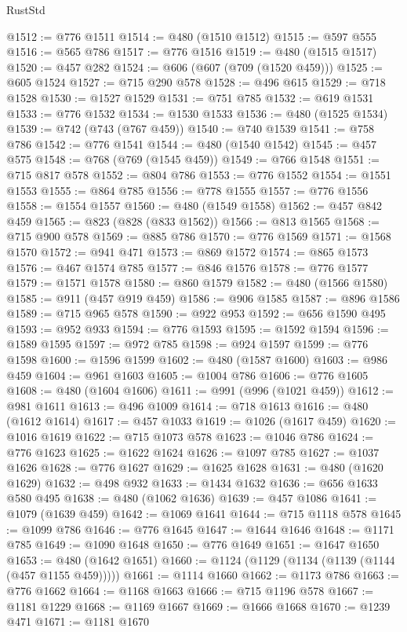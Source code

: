 \begin{lexlean}{RustStd}
\begin{coremodule}
@1512 := @776 @1511
@1514 := @480 (@1510 @1512)
@1515 := @597 @555
@1516 := @565 @786
@1517 := @776 @1516
@1519 := @480 (@1515 @1517)
@1520 := @457 @282
@1524 := @606 (@607 (@709 (@1520 @459)))
@1525 := @605 @1524
@1527 := @715 @290 @578
@1528 := @496 @615
@1529 := @718 @1528
@1530 := @1527 @1529
@1531 := @751 @785
@1532 := @619 @1531
@1533 := @776 @1532
@1534 := @1530 @1533
@1536 := @480 (@1525 @1534)
@1539 := @742 (@743 (@767 @459))
@1540 := @740 @1539
@1541 := @758 @786
@1542 := @776 @1541
@1544 := @480 (@1540 @1542)
@1545 := @457 @575
@1548 := @768 (@769 (@1545 @459))
@1549 := @766 @1548
@1551 := @715 @817 @578
@1552 := @804 @786
@1553 := @776 @1552
@1554 := @1551 @1553
@1555 := @864 @785
@1556 := @778 @1555
@1557 := @776 @1556
@1558 := @1554 @1557
@1560 := @480 (@1549 @1558)
@1562 := @457 @842 @459
@1565 := @823 (@828 (@833 @1562))
@1566 := @813 @1565
@1568 := @715 @900 @578
@1569 := @885 @786
@1570 := @776 @1569
@1571 := @1568 @1570
@1572 := @941 @471
@1573 := @869 @1572
@1574 := @865 @1573
@1576 := @467 @1574 @785
@1577 := @846 @1576
@1578 := @776 @1577
@1579 := @1571 @1578
@1580 := @860 @1579
@1582 := @480 (@1566 @1580)
@1585 := @911 (@457 @919 @459)
@1586 := @906 @1585
@1587 := @896 @1586
@1589 := @715 @965 @578
@1590 := @922 @953
@1592 := @656 @1590 @495
@1593 := @952 @933
@1594 := @776 @1593
@1595 := @1592 @1594
@1596 := @1589 @1595
@1597 := @972 @785
@1598 := @924 @1597
@1599 := @776 @1598
@1600 := @1596 @1599
@1602 := @480 (@1587 @1600)
@1603 := @986 @459
@1604 := @961 @1603
@1605 := @1004 @786
@1606 := @776 @1605
@1608 := @480 (@1604 @1606)
@1611 := @991 (@996 (@1021 @459))
@1612 := @981 @1611
@1613 := @496 @1009
@1614 := @718 @1613
@1616 := @480 (@1612 @1614)
@1617 := @457 @1033
@1619 := @1026 (@1617 @459)
@1620 := @1016 @1619
@1622 := @715 @1073 @578
@1623 := @1046 @786
@1624 := @776 @1623
@1625 := @1622 @1624
@1626 := @1097 @785
@1627 := @1037 @1626
@1628 := @776 @1627
@1629 := @1625 @1628
@1631 := @480 (@1620 @1629)
@1632 := @498 @932
@1633 := @1434 @1632
@1636 := @656 @1633 @580 @495
@1638 := @480 (@1062 @1636)
@1639 := @457 @1086
@1641 := @1079 (@1639 @459)
@1642 := @1069 @1641
@1644 := @715 @1118 @578
@1645 := @1099 @786
@1646 := @776 @1645
@1647 := @1644 @1646
@1648 := @1171 @785
@1649 := @1090 @1648
@1650 := @776 @1649
@1651 := @1647 @1650
@1653 := @480 (@1642 @1651)
@1660 := @1124 (@1129 (@1134 (@1139 (@1144 (@457 @1155 @459)))))
@1661 := @1114 @1660
@1662 := @1173 @786
@1663 := @776 @1662
@1664 := @1168 @1663
@1666 := @715 @1196 @578
@1667 := @1181 @1229
@1668 := @1169 @1667
@1669 := @1666 @1668
@1670 := @1239 @471
@1671 := @1181 @1670

\end{coremodule}
\end{lexlean}
